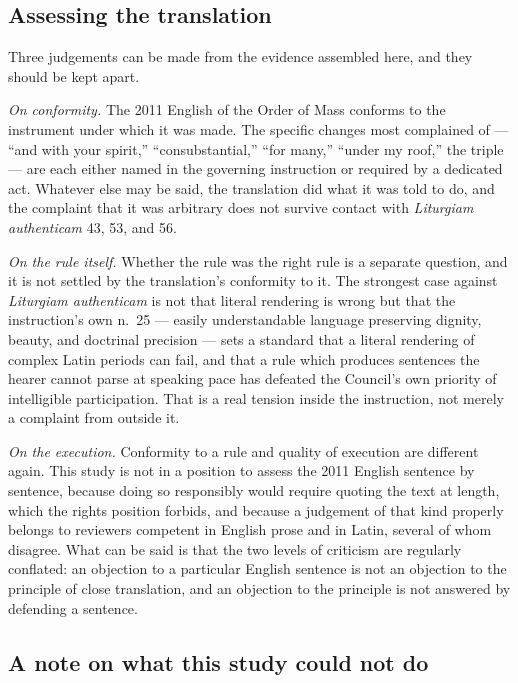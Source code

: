 \subsection{Assessing the translation}

Three judgements can be made from the evidence assembled here, and they should be kept apart.

\emph{On conformity.} The 2011 English of the Order of Mass conforms to the instrument under
which it was made. The specific changes most complained of --- ``and with your spirit,''
``consubstantial,'' ``for many,'' ``under my roof,'' the triple  --- are each
either named in the governing instruction or required by a dedicated act. Whatever else may be
said, the translation did what it was told to do, and the complaint that it was arbitrary does
not survive contact with \emph{Liturgiam authenticam} 43, 53, and 56.

\emph{On the rule itself.} Whether the rule was the right rule is a separate question, and it
is not settled by the translation's conformity to it. The strongest case against
\emph{Liturgiam authenticam} is not that literal rendering is wrong but that the instruction's
own n.\ 25 --- easily understandable language preserving dignity, beauty, and doctrinal
precision --- sets a standard that a literal rendering of complex Latin periods can fail, and
that a rule which produces sentences the hearer cannot parse at speaking pace has defeated the
Council's own priority of intelligible participation. That is a real tension inside the
instruction, not merely a complaint from outside it.

\emph{On the execution.} Conformity to a rule and quality of execution are different again. This
study is not in a position to assess the 2011 English sentence by sentence, because doing so
responsibly would require quoting the text at length, which the rights position forbids, and
because a judgement of that kind properly belongs to reviewers competent in English prose and
in Latin, several of whom disagree. What can be said is that the two levels of criticism are
regularly conflated: an objection to a particular English sentence is not an objection to the
principle of close translation, and an objection to the principle is not answered by defending
a sentence.

\subsection{A note on what this study could not do}

